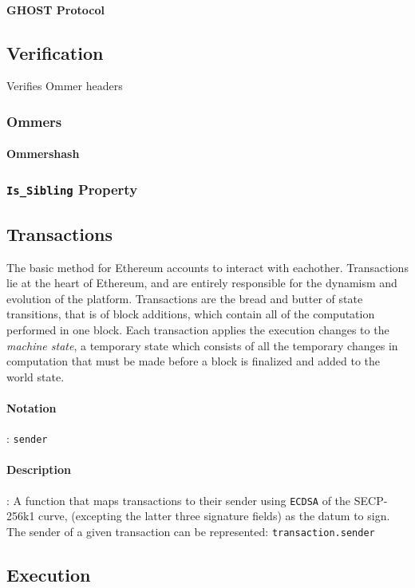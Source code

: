 \documentclass[10pt,a4paper,leqno,bibliography=totoc]{scrartcl}
\newenvironment{alphafootnotes}
{\par\edef\savedfootnotenumber{\number\value{footnote}}
\renewcommand{\thefootnote}{\alph{footnote}}
\setcounter{footnote}{0}}
{\par\setcounter{footnote}{\savedfootnotenumber}}
\begin{document}
\begin{alphafootnotes}
\begin{multicols*}{2}
			\paragraph{GHOST Protocol}

		\subsection{Verification}
		    Verifies Ommer headers

			\subsubsection{Ommers}
				\paragraph{Ommershash}

			\subsubsection{\texttt{Is\_Sibling} Property}

		\subsection{Transactions}
			The basic method for Ethereum accounts to interact with eachother. Transactions lie at the heart of Ethereum, and are entirely responsible for the dynamism and evolution of the platform. Transactions are the bread and butter of state transitions, that is of block additions, which contain all of the computation performed in one block. Each transaction applies the execution changes to the \textit{machine state}, a temporary state which consists of all the temporary changes in computation that must be made before a block is finalized and added to the world state.
\paragraph{Notation}: \texttt{sender}
\paragraph{Description}: A function that maps transactions to their sender using \texttt{ECDSA} of the SECP-256k1 curve, (excepting the latter three signature fields) as the datum to sign. The sender of a given transaction can be represented:
\texttt{transaction.sender}

		\subsection{Execution}

\end{multicols*}
\end{alphafootnotes}
\end{document}
